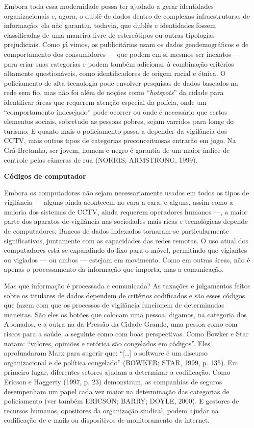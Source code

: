 Embora toda essa modernidade possa ter ajudado a gerar identidades
organizacionais e, agora, o dublê de dados dentro de complexas
infraestruturas de informação, ela não garantiu, todavia, que dublês e
identidades fossem classificadas de uma maneira livre de estereótipos ou
outras tipologias prejudiciais. Como já vimos, os publicitários usam os
dados geodemográficos e de comportamento dos consumidores --- que podem
em si mesmos ser inexatos --- para criar suas categorias e podem também
adicionar à combinação critérios altamente questionáveis, como
identificadores de origem racial e étnica. O policiamento de alta
tecnologia pode envolver pesquisas de dados baseados na rede sem fio,
mas não foi além de noções como ``\emph{hotspots}'' da cidade para
identificar áreas que requerem atenção especial da polícia, onde um
``comportamento indesejado'' pode ocorrer ou onde é necessário que
certos elementos sociais, sobretudo as pessoas pobres, sejam varridos
para longe do turismo. E quanto mais o policiamento passa a depender da
vigilância dos CCTV, mais outros tipos de categorias preconceituosas
entrarão em jogo. Na Grã-Bretanha, ser jovem, homem e negro é garantia
de um maior índice de controle pelas câmeras de rua (NORRIS; ARMSTRONG,
1999).

\textbf{Códigos de computador}

Embora os computadores não sejam necessariamente usados em todos os
tipos de vigilância --- alguns ainda acontecem no cara a cara, e alguns,
assim como a maioria dos sistemas de CCTV, ainda requerem operadores
humanos ---, a maior parte dos aparatos de vigilância nas sociedades
mais ricas e tecnológicas depende de computadores. Bancos de dados
indexados tornaram-se particularmente significativos, juntamente com as
capacidades das redes remotas. O uso atual dos computadores está se
expandindo do fixo para o móvel, permitindo que vigiantes ou vigiados
--- ou ambos --- estejam em movimento. Como em outras áreas, não é
apenas o processamento da informação que importa, mas a comunicação.

Mas que informação é processada e comunicada? As taxações e julgamentos
feitos sobre os titulares de dados dependem de critérios codificados e
são esses códigos que fazem com que os processos de vigilância funcionem
de determinadas maneiras. São eles os botões que colocam uma pessoa,
digamos, na categoria dos Abonados, e a outra na da Pressão da Cidade
Grande, uma pessoa como com riscos para a saúde, a seguinte como com
boas perspectivas. Como Bowker e Star notam: ``valores, opiniões e
retórica são congelados em códigos''. Eles aprofundaram Marx para
sugerir que: ``{[}\ldots{}{]} o software é um discurso organizacional e
de política congelado'' (BOWKER; STAR, 1999, p. 135). Em primeiro lugar,
diferentes setores ajudam a determinar a codificação. Como Ericson e
Haggerty (1997, p. 23) demonstram, as companhias de seguros desempenham
um papel cada vez maior na determinação das categorias de policiamento
(ver também ERICSON; BARRY; DOYLE, 2000). E gestores de recursos
humanos, opositores da organização sindical, podem ajudar na codificação
de e-mails ou dispositivos de monitoramento da internet.

